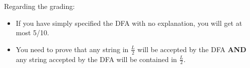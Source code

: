 \documentclass{article}
\begin{document}
    Regarding the grading:
    \begin{itemize}
        \item If you have simply specified the DFA with no explanation, you will get at most 5/10.
        \item You need to prove that any string in $\frac{L}{2}$ will be accepted by the DFA \textbf{AND} any string accepted by the DFA will be contained in $\frac{L}{2}$. 
    \end{itemize}
    
\end{document}
